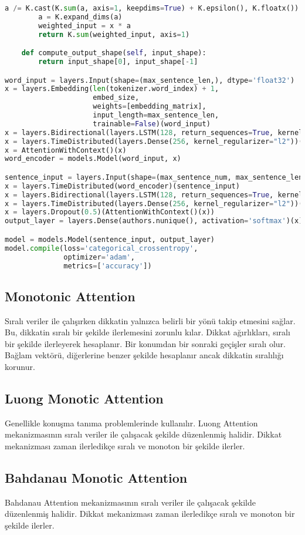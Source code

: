 \begin{lstlisting}[language=Python]
        a /= K.cast(K.sum(a, axis=1, keepdims=True) + K.epsilon(), K.floatx())
        a = K.expand_dims(a)
        weighted_input = x * a
        return K.sum(weighted_input, axis=1)

    def compute_output_shape(self, input_shape):
        return input_shape[0], input_shape[-1]

word_input = layers.Input(shape=(max_sentence_len,), dtype='float32')
x = layers.Embedding(len(tokenizer.word_index) + 1, 
                     embed_size, 
                     weights=[embedding_matrix], 
                     input_length=max_sentence_len, 
                     trainable=False)(word_input)
x = layers.Bidirectional(layers.LSTM(128, return_sequences=True, kernel_regularizer="l2"))(x)
x = layers.TimeDistributed(layers.Dense(256, kernel_regularizer="l2"))(x)
x = AttentionWithContext()(x)
word_encoder = models.Model(word_input, x)

sentence_input = layers.Input(shape=(max_sentence_num, max_sentence_len), dtype='float32')
x = layers.TimeDistributed(word_encoder)(sentence_input)
x = layers.Bidirectional(layers.LSTM(128, return_sequences=True, kernel_regularizer="l2"))(x)
x = layers.TimeDistributed(layers.Dense(256, kernel_regularizer="l2"))(x)
x = layers.Dropout(0.5)(AttentionWithContext()(x))
output_layer = layers.Dense(authors.nunique(), activation='softmax')(x)

model = models.Model(sentence_input, output_layer)
model.compile(loss='categorical_crossentropy', 
              optimizer='adam', 
              metrics=['accuracy'])
\end{lstlisting}

\newpage

\subsection{Monotonic Attention}
Sıralı veriler ile çalışırken dikkatin yalnızca belirli bir yönü takip etmesini sağlar. Bu, dikkatin sıralı bir şekilde ilerlemesini zorunlu kılar. Dikkat ağırlıkları, sıralı bir şekilde ilerleyerek hesaplanır. Bir konumdan bir sonraki geçişler sıralı olur. Bağlam vektörü, diğerlerine benzer şekilde hesaplanır ancak dikkatin sıralılığı korunur.

\newpage

\subsection{Luong Monotic Attention}
Genellikle konuşma tanıma problemlerinde kullanılır. Luong Attention mekanizmasının sıralı veriler ile çalışacak şekilde düzenlenmiş halidir. Dikkat mekanizması zaman ilerledikçe sıralı ve monoton bir şekilde ilerler.

\newpage

\subsection{Bahdanau Monotic Attention}
Bahdanau Attention mekanizmasının sıralı veriler ile çalışacak şekilde düzenlenmiş halidir. Dikkat mekanizması zaman ilerledikçe sıralı ve monoton bir şekilde ilerler.

\newpage